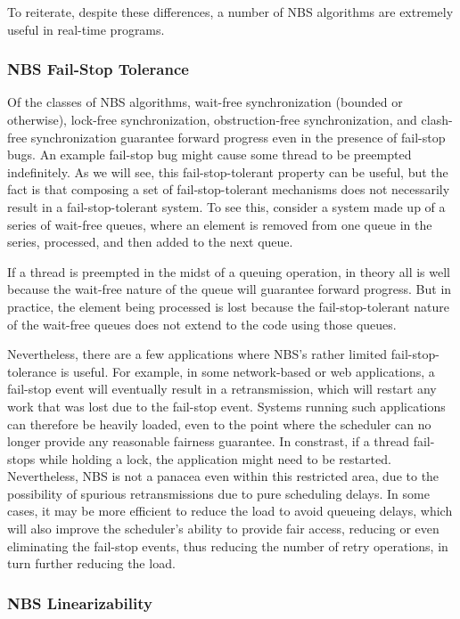 To reiterate, despite these differences, a number of NBS algorithms are
extremely useful in real-time programs.

\subsubsection{NBS Fail-Stop Tolerance}
\label{sec:advsync:NBS Fail-Stop Tolerance}

Of the classes of NBS algorithms, wait-free synchronization (bounded or
otherwise), lock-free synchronization, obstruction-free synchronization,
and clash-free synchronization guarantee forward progress even in the
presence of fail-stop bugs.
An example fail-stop bug might cause some thread to be preempted indefinitely.
As we will see, this fail-stop-tolerant property can be useful, but the
fact is that composing a set of fail-stop-tolerant mechanisms does not
necessarily result in a fail-stop-tolerant system.
To see this, consider a system made up of a series of wait-free queues,
where an element is removed from one queue in the series, processed,
and then added to the next queue.

If a thread is preempted in the midst of a queuing operation, in theory
all is well because the wait-free nature of the queue will guarantee
forward progress.
But in practice, the element being processed is lost because the
fail-stop-tolerant nature of the wait-free queues does not extend to
the code using those queues.

Nevertheless, there are a few applications where NBS's rather limited
fail-stop-tolerance is useful.
For example, in some network-based or web applications, a fail-stop
event will eventually result in a retransmission, which will restart
any work that was lost due to the fail-stop event.
Systems running such applications can therefore be heavily loaded, even
to the point where the scheduler can no longer provide any reasonable
fairness guarantee.
In constrast, if a thread fail-stops while holding a lock, the application
might need to be restarted.
Nevertheless, NBS is not a panacea even within this restricted area,
due to the possibility of spurious retransmissions due to pure scheduling
delays.
In some cases, it may be more efficient to reduce the load to avoid
queueing delays, which will also improve the scheduler's ability to
provide fair access, reducing or even eliminating the fail-stop events,
thus reducing the number of retry operations, in turn further reducing
the load.

\subsubsection{NBS Linearizability}
\label{sec:advsync:NBS Linearizability}


